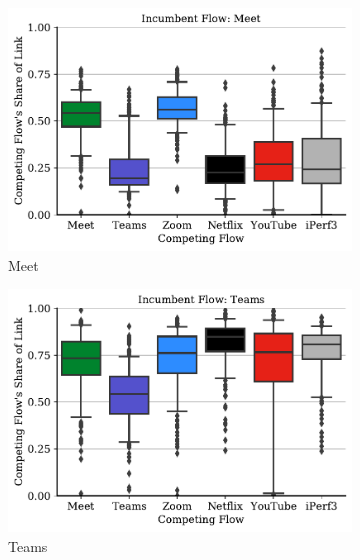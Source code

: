 \begin{figure}[t!]
\centering
\begin{subfigure}[t]{.33\textwidth}
    \centering
    \includegraphics[width=1\textwidth]{figures/comp/box_plot_meet_dl_0.5.pdf}
    \caption{Meet}
    \label{fig:zoom_box_1}
\end{subfigure}\hfill
\begin{subfigure}[t]{.33\textwidth}
    \centering
    \includegraphics[width=1\textwidth]{figures/comp/box_plot_teams_dl_0.5.pdf}
    \caption{Teams}
    \label{fig:zoom_box_1}
\end{subfigure}
\begin{subfigure}[t]{.33\textwidth}
    \centering

\end{subfigure}
\end{figure}
